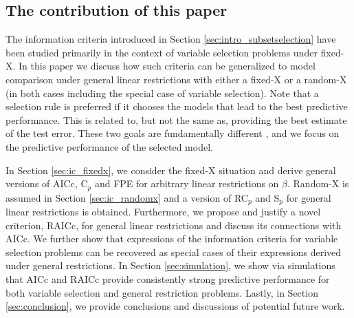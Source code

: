 \subsection{The contribution of this paper}
The information criteria introduced in Section \ref{sec:intro_subsetselection} have been studied primarily in the context of variable selection problems under fixed-X. In this paper we discuss how such criteria can be generalized to model comparison under general linear restrictions with either a fixed-X or a random-X (in both cases including the special case of variable selection). Note that a selection rule is preferred if it chooses the models that lead to the best predictive performance. This is related to, but not the same as, providing the best estimate of the test error. These two goals are fundamentally different \citep[see, e.g.,][Section 7]{hastie2009elements}, and we focus on the predictive performance of the selected model.

In Section \ref{sec:ic_fixedx}, we consider the fixed-X situation and derive general versions of AICc, C$_p$ and FPE for arbitrary linear restrictions on $\beta$. Random-X is assumed in Section \ref{sec:ic_randomx} and a version of RC$_p$ and S$_p$ for general linear restrictions is obtained. Furthermore, we propose and justify a novel criterion, RAICc, for general linear restrictions and discuss its connections with AICc. We further show that expressions of the information criteria for variable selection problems can be recovered as special cases of their expressions derived under general restrictions. In Section \ref{sec:simulation}, we show via simulations that AICc and RAICc provide consistently strong predictive performance for both variable selection and general restriction problems. Lastly, in Section \ref{sec:conclusion}, we provide conclusions and discussions of potential future work.

